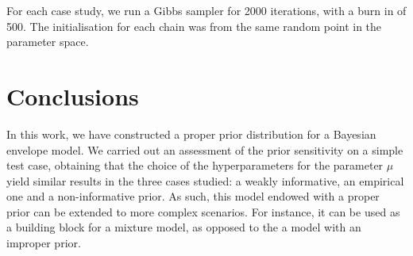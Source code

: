 \documentclass[graybox]{svmult}
\begin{document}
For each case study, we run a Gibbs sampler for 2000 iterations, with
a burn in of 500. The initialisation for each chain was from the same
random point in the parameter space.

\section{Conclusions}
In this work, we have constructed a proper prior distribution for a
Bayesian envelope model. We carried out an assessment of the prior
sensitivity on a simple test case, obtaining that the choice of the
hyperparameters for the parameter $\mu$ yield similar results in the
three cases studied: a weakly informative, an empirical one and a
non-informative prior. As such, this model endowed with a proper prior
can be extended to more complex scenarios. For instance, it can be
used as a building block for a mixture model, as opposed to the a
model with an improper prior.


\end{document}
